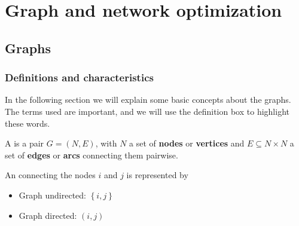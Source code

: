 \section{Graph and network optimization}

\subsection{Graphs}

\subsubsection{Definitions and characteristics}

In the following section we will explain some basic concepts about the graphs. The terms used are important, and we will use the definition box to highlight these words.

\highspace
\begin{definitionbox}[: graph]
    A  is a pair $G = \left(N,E\right)$, with $N$ a set of \textbf{nodes} or \textbf{vertices} and $E \subseteq N \times N$ a set of \textbf{edges} or \textbf{arcs} connecting them pairwise.
\end{definitionbox}

\highspace
\begin{definitionbox}[: edge]
    An  connecting the nodes $i$ and $j$ is represented by
    \begin{itemize}
        \item Graph undirected: $\left\{i,j\right\}$
        \item Graph directed: $\left(i,j\right)$
    \end{itemize}
\end{definitionbox}

